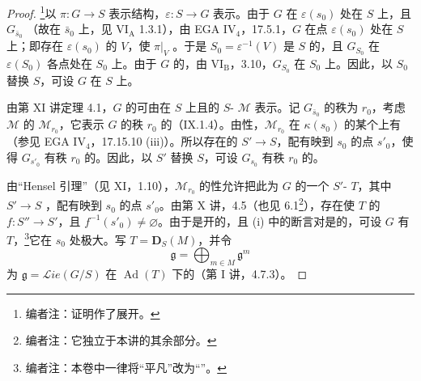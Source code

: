 \begin{proof}
\footnote[20]{编者注：证明作了展开。}以 $\pi:G\to S$ 表示结构，$\varepsilon:S\to G$ 表示。由于 $G$ 在 $\varepsilon(s_0)$ 处在 $S$ 上，且 $G_{\bar s_0}$ （故在 $\bar s_0$ 上，见 VI$_{\mathrm A}$ 1.3.1），由 EGA IV$_4$，17.5.1，$G$ 在点 $\varepsilon(s_0)$ 处在 $S$ 上；即存在 $\varepsilon(s_0)$ 的 $V$，使 $\pi|_V$ 。于是 $S_0=\varepsilon^{-1}(V)$ 是 $S$ 的，且 $G_{S_0}$
在 $\varepsilon(S_0)$ 各点处在 $S_0$ 上。由于 $G$ 的，由 VI$_{\mathrm B}$，3.10，$G_{S_0}$ 在 $S_0$ 上。因此，以 $S_0$ 替换 $S$，可设 $G$ 在 $S$ 上。

由第 XI 讲定理 4.1，$G$ 的可由在 $S$ 上且的 $S$- $\mathscr M$ 表示。记 $G_{\bar s_0}$ 的秩为 $r_0$，考虑 $\mathscr M$ 的 $\mathscr M_{r_0}$，它表示 $G$ 的秩 $r_0$ 的（IX.1.4）。由性，$\mathscr M_{r_0}$ 在 $\kappa(s_0)$ 的某个上有（参见 EGA IV$_4$，17.15.10 (iii)）。所以存在的 $S'\to S$，配有映到 $s_0$ 的点 $s'_0$，使得 $G_{s'_0}$ 有秩 $r_0$ 的。因此，以 $S'$ 替换 $S$，可设 $G_{s_0}$ 有秩 $r_0$ 的。

由“Hensel 引理”（见 XI，1.10），$\mathscr M_{r_0}$ 的性允许把此为 $G$ 的一个 $S'$- $T$，其中 $S'\to S$ ，配有映到 $s_0$ 的点 $s'_0$。由第 X 讲，4.5（也见 6.1\footnote[21]{编者注：它独立于本讲的其余部分。}），存在使 $T$ 的 $f:S''\to S'$，且 $f^{-1}(s'_0)\ne\varnothing$。由于是开的，且 (i) 中的断言对是的，可设 $G$ 有 $T$，\footnote[22]{编者注：本卷中一律将“平凡”改为“”。}它在 $s_0$ 处极大。写 $T=\mathbf D_S(M)$，并令
\[
\mathfrak g=\bigoplus_{m\in M}\mathfrak g^m
\]
为 $\mathfrak g=\mathscr{L}\!ie(G/S)$ 在 $\operatorname{Ad}(T)$ 下的（第 I 讲，4.7.3）。


\end{proof}
